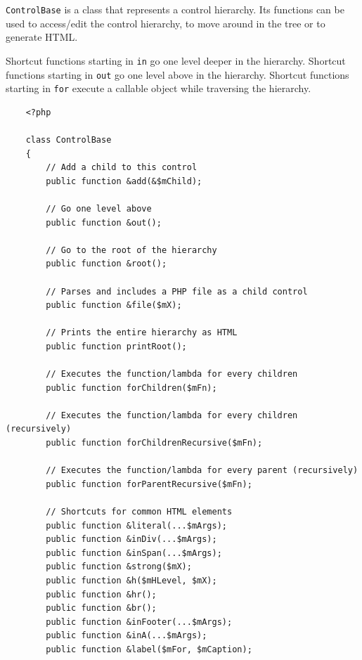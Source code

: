 \documentclass[12pt]{report}
\begin{document}
                    \texttt{ControlBase} is a class that represents a control hierarchy. Its functions can be used to access/edit the control hierarchy, to move around in the tree or to generate HTML.

                    Shortcut functions starting in \texttt{in} go one level deeper in the hierarchy.
                    Shortcut functions starting in \texttt{out} go one level above in the hierarchy.
                    Shortcut functions starting in \texttt{for} execute a callable object while traversing the hierarchy.

                    \begin{verbatim}
    <?php

    class ControlBase
    {
        // Add a child to this control
        public function &add(&$mChild);

        // Go one level above
        public function &out();

        // Go to the root of the hierarchy
        public function &root();

        // Parses and includes a PHP file as a child control
        public function &file($mX);

        // Prints the entire hierarchy as HTML
        public function printRoot();

        // Executes the function/lambda for every children
        public function forChildren($mFn);

        // Executes the function/lambda for every children (recursively)
        public function forChildrenRecursive($mFn);

        // Executes the function/lambda for every parent (recursively)
        public function forParentRecursive($mFn);

        // Shortcuts for common HTML elements
        public function &literal(...$mArgs);
        public function &inDiv(...$mArgs);
        public function &inSpan(...$mArgs);
        public function &strong($mX);
        public function &h($mHLevel, $mX);
        public function &hr();
        public function &br();
        public function &inFooter(...$mArgs);
        public function &inA(...$mArgs);
        public function &label($mFor, $mCaption);


\end{verbatim}
\end{document}
